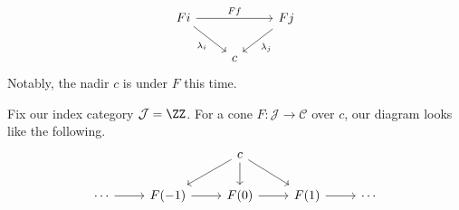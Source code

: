 \documentclass[../notes.tex]{subfiles}
\begin{document}
\[\begin{tikzcd}
	Fi && Fj \\
	& c
	\arrow["Ff", from=1-1, to=1-3]
	\arrow["{\lambda_i}"', from=1-1, to=2-2]
	\arrow["{\lambda_j}", from=1-3, to=2-2]
\end{tikzcd}\]
Notably, the nadir $c$ is under $F$ this time.
\begin{example}
	Fix our index category $\mathcal J=\ZZ$. For a cone $F:\mathcal J\to\mathcal C$ over $c$, our diagram looks like the following.
	\[\begin{tikzcd}
		&& c \\
		\cdots & {F(-1)} & {F(0)} & {F(1)} & \cdots
		\arrow[from=2-1, to=2-2]
		\arrow[from=2-2, to=2-3]
		\arrow[from=2-3, to=2-4]
		\arrow[from=2-4, to=2-5]
		\arrow[from=1-3, to=2-2]
		\arrow[from=1-3, to=2-3]
		\arrow[from=1-3, to=2-4]
	\end{tikzcd}\]
\end{example}
\end{document}
